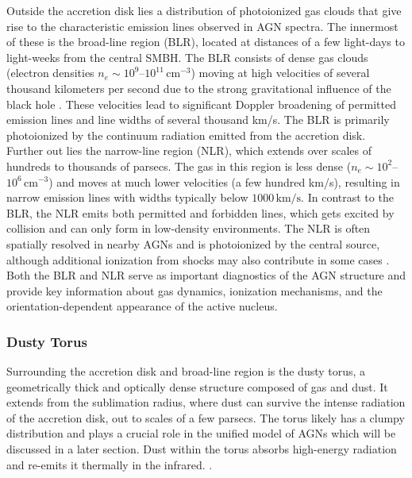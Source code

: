 Outside the accretion disk lies a distribution of photoionized gas clouds that give rise to the characteristic emission lines observed in AGN spectra. The innermost of these is the broad-line region (BLR), located at distances of a few light-days to light-weeks from the central SMBH. The BLR consists of dense gas clouds (electron densities $n_e \sim 10^9$–$10^{11}\,\mathrm{cm}^{-3}$) moving at high velocities of several thousand kilometers per second due to the strong gravitational influence of the black hole \parencite{netzer2013agn}. These velocities lead to significant Doppler broadening of permitted emission lines and line widths of several thousand km/s. The BLR is primarily photoionized by the continuum radiation emitted from the accretion disk.\\
Further out lies the narrow-line region (NLR), which extends over scales of hundreds to thousands of parsecs. The gas in this region is less dense ($n_e \sim 10^2$–$10^6\,\mathrm{cm}^{-3}$) and moves at much lower velocities (a few hundred km/s), resulting in narrow emission lines with widths typically below $1000\,\mathrm{km/s}$. In contrast to the BLR, the NLR emits both permitted and forbidden lines, which gets excited by collision and can only form in low-density environments. The NLR is often spatially resolved in nearby AGNs and is photoionized by the central source, although additional ionization from shocks may also contribute in some cases \parencite{hickox2018obscured,netzer2013agn}.\\
Both the BLR and NLR serve as important diagnostics of the AGN structure and provide key information about gas dynamics, ionization mechanisms, and the orientation-dependent appearance of the active nucleus.



\subsubsection{Dusty Torus}
Surrounding the accretion disk and broad-line region is the dusty torus, a geometrically thick and optically dense structure composed of gas and dust. It extends from the sublimation radius, where dust can survive the intense radiation of the accretion disk, out to scales of a few parsecs. The torus likely has a clumpy distribution and plays a crucial role in the unified model of AGNs which will be discussed in a later section. Dust within the torus absorbs high-energy radiation and re-emits it thermally in the infrared. \parencite{netzer2013agn,hickox2018obscured}.




